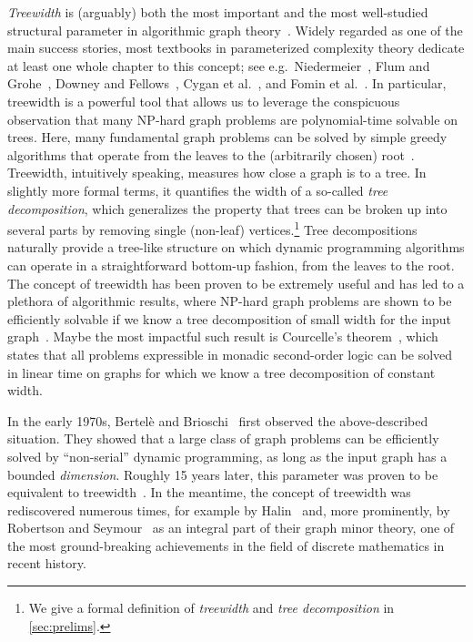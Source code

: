 \documentclass[a4paper,UKenglish,cleveref, autoref, thm-restate, numberwithinsect]{lipics-v2021}
\newcounter{algorithm}
\begin{document}
\emph{Treewidth} is (arguably) both the most important and the most well-studied structural parameter in algorithmic graph theory~\cite{Bodlaender93,Bodlaender97,Bodlaender05,Bodlaender06,Bodlaender07,FluschnikMNRZ20,Kloks94}. 
Widely regarded as one of the main success stories, most textbooks in parameterized complexity theory dedicate at least one whole chapter to this concept; see e.g.\ Niedermeier~\cite[Chapter~10]{Nie06}, Flum and Grohe~\cite[Chapters~11~\&~12]{FG06}, Downey and Fellows~\cite[Chapters~10--14]{DF13}, Cygan et al.~\cite[Chapter~7]{Cyg+15}, and Fomin et al.~\cite[Chapter~14]{Fom+19}.
In particular, treewidth is a powerful tool that allows us to leverage the conspicuous observation that many NP-hard graph problems are polynomial-time solvable on trees. 
Here, many fundamental graph problems can be solved by simple greedy algorithms that operate from the leaves to the (arbitrarily chosen) root~\cite{cockayne1975linear,daykin1966algorithms,GJ79,mitchell1979linear}. 
Treewidth, intuitively speaking, measures how close a graph is to a tree. In slightly more formal terms, it quantifies the width of a so-called \emph{tree decomposition}, which generalizes the property that trees can be broken up into several parts by removing single (non-leaf) vertices.\footnote{We give a formal definition of \emph{treewidth} and \emph{tree decomposition} in \cref{sec:prelims}.} Tree decompositions naturally provide a tree-like structure on which dynamic programming algorithms can operate in a straightforward bottom-up fashion, from the leaves to the root. The concept of treewidth has been proven to be extremely useful and has led to a plethora of algorithmic results, where NP-hard graph problems are shown to be efficiently solvable if we know a tree decomposition of small width for the input graph~\cite{arnborg1985efficient,arnborg1991easy,arnborg1989linear,bern1987linear,Bodlaender88,bodlaender2008combinatorial}.
Maybe the most impactful such result is Courcelle's theorem~\cite{borie1992automatic,courcelle1990monadic,courcelle2012graph}, which states that all problems expressible in monadic second-order logic can be solved in linear time on graphs for which we know a tree decomposition of constant width.


In the early 1970s, Bertel\`{e} and Brioschi~\cite{bertele1972nonserial} first observed the above-described situation. They showed that a large class of graph problems can be efficiently solved by ``non-serial'' dynamic programming, as long as the input graph has a bounded \emph{dimension}. Roughly 15 years later, this parameter was proven to be equivalent to treewidth~\cite{arnborg1985efficient,Bodlaender98}. In the meantime, the concept of treewidth was rediscovered numerous times, for example by Halin~\cite{halin1976s} and, more prominently, by Robertson and Seymour~\cite{robertson1984graph,robertson1986graph,robertson1995graph} as an integral part of their graph minor theory, one of the most ground-breaking achievements in the field of discrete mathematics in recent history.
\end{document}
